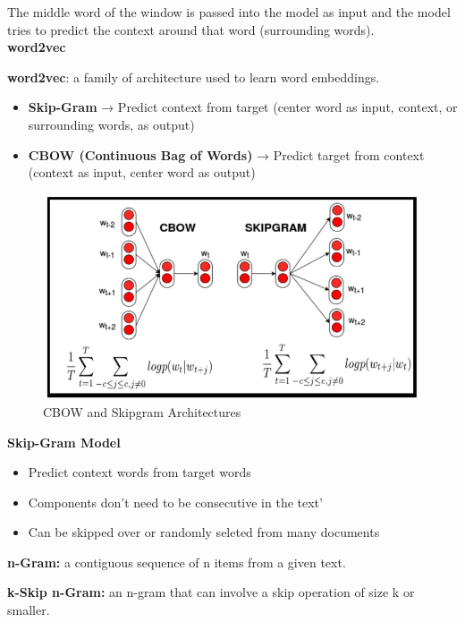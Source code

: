The middle word of the window is passed into the model as input and the model tries to predict the context around that word (surrounding words).\\

\noindent\textbf{word2vec}
\begin{definition}
    \textbf{word2vec}: a family of architecture used to learn word embeddings.
\end{definition}
\begin{itemize}
    \item \textbf{Skip-Gram} → Predict context from target (center word as input, context, or surrounding words, as output)
    \item \textbf{CBOW (Continuous Bag of Words)} → Predict target from context (context as input, center word as output)
\end{itemize}

\begin{figure}[h!t]
    \centering
    \includegraphics[width=0.75\linewidth]{skipgramcbow.png}
    \caption{CBOW and Skipgram Architectures}
    \label{fig:enter-label}
\end{figure}

\textbf{Skip-Gram Model}
\begin{itemize}
    \item Predict context words from target words
    \item Components don't need to be consecutive in the text'
    \item Can be skipped over or randomly seleted from many documents
\end{itemize}

\begin{definition}
    \textbf{n-Gram:} a contiguous  sequence of n items from a given text.
\end{definition}

\begin{definition}
    \textbf{k-Skip n-Gram:} an n-gram that can involve a skip operation of size k or smaller.
\end{definition}

